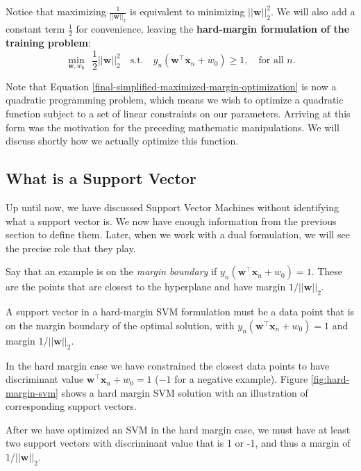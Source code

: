 Notice that maximizing $\frac{1}{||\textbf{w}||_2}$ is equivalent to minimizing $||\textbf{w}||_2^{2}$. We will also add a constant term $\frac{1}{2}$ for convenience, leaving the {\bf hard-margin formulation of the training problem}:
%
\begin{equation} \label{final-simplified-maximized-margin-optimization}
	\underset{\textbf{w}, w_{0}}{\min}\ \  \frac{1}{2} ||\textbf{w}||_2^{2} \quad \text{s.t.} \quad y_{n}(\textbf{w}^\top\textbf{x}_{n} + w_{0}) \geq 1, \quad \mbox{for all $n$}.
\end{equation}

Note that Equation \ref{final-simplified-maximized-margin-optimization} is now a quadratic programming problem, which means we wish to optimize a quadratic function subject to a set of linear constraints on our parameters. Arriving at this form was the motivation for the preceding mathematic manipulations. We will discuss shortly how we actually optimize this function.

\subsection{What is a Support Vector}

Up until now, we have discussed Support Vector Machines without identifying what a support vector is. We now have enough information from the previous section to define them. Later, when we work with a dual formulation, we will see the precise role that they play.

Say that an
example is on the {\em margin boundary}
if $y_{n}(\textbf{w}^\top\textbf{x}_{n} + w_{0}) =1$. These are the points that are closest to the hyperplane and have margin $1/||{\mathbf w}||_2$.
%
\begin{definition}
  A support vector in a  hard-margin SVM  formulation  must be a data point that is on
  the margin boundary of the optimal solution, with $y_{n}(\textbf{w}^\top\textbf{x}_{n} + w_{0}) =1$ and margin $1/||{\mathbf w}||_2$.
\end{definition}

In the hard margin case we have constrained the closest data points to
have discriminant value $\textbf{w}^\top\textbf{x}_{n} + w_{0} = 1$ ($-1$ for a negative example).
Figure \ref{fig:hard-margin-svm} shows a hard margin SVM solution with an illustration of
corresponding support vectors.

\begin{warning}
  After we have optimized an SVM in the hard margin case, we must have at least two support vectors with discriminant value that is 1 or -1, and thus a margin of $1/||\mathbf{w}||_2$.
\end{warning}

